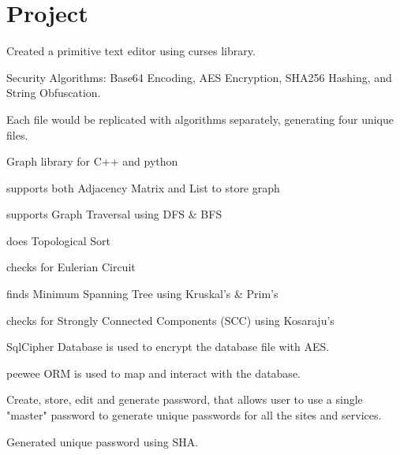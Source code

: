 \documentclass[]{deedy-resume-openfont}
\begin{document}
\hfill
\begin{minipage}[t]{0.66\textwidth}


\section{Project}

\vspace{\topsep} %
\begin{tightemize}
\item Created a primitive text editor using curses library.
\item Security Algorithms: Base64 Encoding, AES Encryption, SHA256 Hashing, and String Obfuscation.
\item Each file would be replicated with algorithms separately, generating four unique files.
\end{tightemize}
\sectionsep

\begin{tightemize}
\item Graph library for C++ and python
\item supports both Adjacency Matrix and List to store graph
\item supports Graph Traversal using DFS \& BFS
\item does Topological Sort
\item checks for Eulerian Circuit
\item finds Minimum Spanning Tree using Kruskal's \& Prim's
\item checks for Strongly Connected Components (SCC) using Kosaraju's
\end{tightemize}
\sectionsep

\begin{tightemize}
\item SqlCipher Database is used to encrypt the database file with AES.
\item peewee ORM is used to map and interact with the database.
\item Create, store, edit and generate password, that allows user to use a single "master" password to
generate unique passwords for all the sites and services.
\item Generated unique password using SHA.
\end{tightemize}
\sectionsep



\end{minipage}
\end{document}
